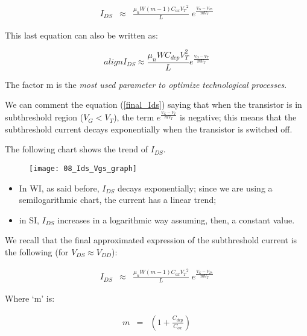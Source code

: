 \documentclass[a4paper, 12pt, twoside, openright]{report}
\begin{document}
   \begin{eqnarray*}
    I_{DS}    &\approx & \frac{\mu_n W \left(m-1 \right) C_{ox} {V_T}^2}{L}\;
            e^{\displaystyle \frac{ {V_G-V_{Th}}}{ mV_T}} 
     \end{eqnarray*}

This last equation can also be written as:

\begin{equation*}[box=\fbox]{align}
I_{DS} \approx \frac{\mu_n W C_{dep} V_T^2}{L} e^{\frac{V_G - V_T}{m V_T}}
\label{final_Ids}
\end{equation*}

The factor m is the \emph{most used parameter to optimize technological processes}.

We can comment the equation (\ref{final_Ids}) saying that when the transistor is in subthreshold region ($V_G < V_T$), the term $e^{\frac{V_G - V_T}{m V_T}}$ is negative; this means that the subthreshold current decays exponentially when the transistor is switched off.

The following chart shows the trend of $I_{DS}$.

	\begin{figure}[H]
	\centering
	\texttt{[image: 08\_Ids\_Vgs\_graph]}
	\caption{}
	\label{}
	\end{figure}

\begin{itemize}
\item In WI, as said before, $I_{DS}$ decays exponentially; since we are using a semilogarithmic chart, the current has a linear trend;
\item in SI,  $I_{DS}$ increases in a logarithmic way assuming, then, a constant value.
\end{itemize}


We recall that the final approximated expression of the subthreshold current is the following (for $V_{DS} \approx V_{DD}$):

   \begin{eqnarray*}
    I_{DS}    &\approx & \frac{\mu_n W \left(m-1 \right) C_{ox} {V_T}^2}{L}\;
            e^{\displaystyle \frac{ {V_G-V_{Th}}}{ mV_T}} 
     \end{eqnarray*}

Where `m' is:

    \begin{eqnarray*}
       {m}&=& \left(1 +\frac{C_{dep}}{C_{ox}}\right)
     \end{eqnarray*}
\end{document}
